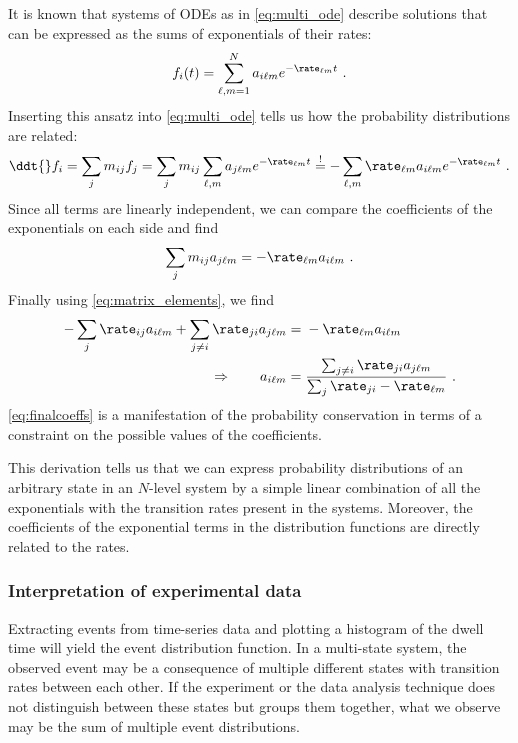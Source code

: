 It is known that systems of ODEs as in \cref{eq:multi_ode} describe solutions that can be expressed as the
sums of exponentials of their rates:
%
\begin{align}\label{eq:ansatz}
    f_i(t)  = \sum_{\ell, m=1}^N a_{i\ell m} e^{- \rate_{\ell m} t}
    \text{ .}
\end{align}
%
Inserting this ansatz into \cref{eq:multi_ode} tells us how the probability distributions are related:
%
\begin{align*}
    \ddt{} f_i = \sum_{j} m_{ij} f_j
               = \sum_{j} m_{ij} \sum_{\ell, m} a_{j\ell m} e^{- \rate_{\ell m} t}
    \overset{!}{=} - \sum_{\ell, m} \rate_{\ell m} a_{i\ell m} e^{- \rate_{\ell m} t}
    \text{ .}
\end{align*}
%
Since all terms are linearly independent, we can compare the coefficients of the exponentials on each side and
find
%
\begin{align}\label{eq:coeffeq}
    \sum_j m_{ij} a_{j\ell m} = - \rate_{\ell m} a_{i\ell m}
    \text{ .}
\end{align}
%
Finally using \cref{eq:matrix_elements}, we find
%
\begin{align}\label{eq:finalcoeffs}
    -\sum_j \rate_{ij} a_{i\ell m} + \sum_{j\ne i} \rate_{ji} a_{j\ell m}
    ={}& - \rate_{\ell m} a_{i\ell m} \nonumber\\
    \Rightarrow\qquad  a_{i\ell m}
    ={}& \frac{\sum_{j\ne i} \rate_{ji} a_{j\ell m}}{\sum_j \rate_{ji} - \rate_{\ell m} }
    \text{ .}
\end{align}
%
\cref{eq:finalcoeffs} is a manifestation of the probability conservation in terms of a constraint on the
possible values of the coefficients.

This derivation tells us that we can express probability distributions of an arbitrary state in an $N$-level
system by a simple linear combination of all the exponentials with the transition rates present in the
systems. Moreover, the coefficients of the exponential terms in the distribution functions are directly
related to the rates.


\subsubsection{Interpretation of experimental data}

Extracting events from time-series data and plotting a histogram of the dwell time will yield the event
distribution function. In a multi-state system, the observed event may be a consequence of multiple different
states with transition rates between each other. If the experiment or the data analysis technique does not
distinguish between these states but groups them together, what we observe may be the sum of multiple event
distributions.

